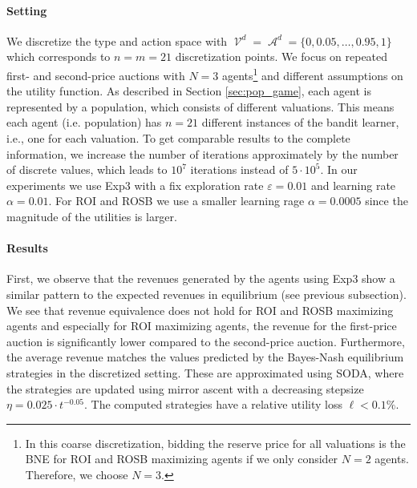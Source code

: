 \documentclass{article}
\DeclareMathOperator{\Acal}{\mathcal{A}}
\DeclareMathOperator{\Vcal}{\mathcal{V}}
\begin{document}
\paragraph{Setting} We discretize the type and action space with $\Vcal^d = \Acal^d = \{0, 0.05, \dots, 0.95, 1\}$ which corresponds to $n=m=21$ discretization points. We focus on repeated first- and second-price auctions with $N=3$ agents\footnote{In this coarse discretization, bidding the reserve price for all valuations is the BNE for ROI and ROSB maximizing agents if we only consider $N=2$ agents. Therefore, we choose $N=3$.} and different assumptions on the utility function. As described in Section \ref{sec:pop_game}, each agent is represented by a population, which consists of different valuations. This means each agent (i.e. population) has $n=21$ different instances of the bandit learner, i.e., one for each valuation. To get comparable results to the complete information, we increase the number of iterations approximately by the number of discrete values, which leads to $10^7$ iterations instead of $5 \cdot 10^5$. 
In our experiments we use Exp3 with a fix exploration rate $\varepsilon=0.01$ and learning rate $\alpha=0.01$. For ROI and ROSB we use a smaller learning rage $\alpha=0.0005$ since the magnitude of the utilities is larger. 

\paragraph{Results}
First, we observe that the revenues generated by the agents using Exp3 show a similar pattern to the expected revenues in equilibrium (see previous subsection).
We see that revenue equivalence does not hold for ROI and ROSB maximizing agents and especially for ROI maximizing agents, the revenue for the first-price auction is significantly lower compared to the second-price auction. 
Furthermore, the average revenue matches the values predicted by the Bayes-Nash equilibrium strategies in the discretized setting. 
These are approximated using SODA, where the strategies are updated using mirror ascent with a decreasing stepsize $\eta = 0.025 \cdot t^{-0.05}$. 
The computed strategies have a relative utility loss $\ell < 0.1\%$.
\end{document}
